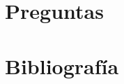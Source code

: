 \documentclass[11pt,letterpaper,spanish]{article}
\begin{document}
\section*{Preguntas}

\begin{enumerate}[label=\arabic*., leftmargin=*]
	
	
	
	
	
\end{enumerate}

\section*{Bibliografía}
\printbibliography
\end{document}
